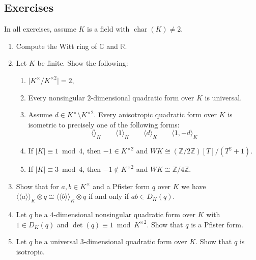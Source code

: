 \documentclass[12pt, leqno, british]{amsart}
\theoremstyle{definition}
\theoremstyle{plain}
\theoremstyle{remark}
\newcommand{\mbb}{\mathbb}
\newcommand{\cc}{\mathbb C}
\newcommand{\rr}{\mathbb R}
\newcommand{\zz}{\mbb Z}
\DeclareMathOperator{\charac}{char}
\newcommand{\llangle}{\langle\!\langle}
\newcommand{\rrangle}{\rangle\!\rangle}
\begin{document}
\subsection{Exercises}
In all exercises, assume $K$ is a field with $\charac(K) \neq 2$.
\begin{enumerate}
\item Compute the Witt ring of $\cc$ and $\rr$.
\item Let $K$ be finite.
Show the following:
\begin{enumerate}
\item $\lvert K^\times / K^{\times 2} \rvert = 2$,
\item Every nonsingular $2$-dimensional quadratic form over $K$ is universal.
\item Assume $d \in K^\times \setminus K^{\times 2}$.
Every anisotropic quadratic form over $K$ is isometric to precisely one of the following forms:
\begin{displaymath}
\langle \rangle_K \qquad \langle 1 \rangle_K \qquad \langle d \rangle_K \qquad \langle 1, -d \rangle_K
\end{displaymath}
\item If $\lvert K \rvert \equiv 1 \bmod 4$, then $-1 \in K^{\times 2}$ and $WK \cong (\zz/2\zz)[T]/(T^2 + 1)$.
\item If $\lvert K \rvert \equiv 3 \bmod 4$, then $-1 \not\in K^{\times 2}$ and $WK \cong \zz/4\zz$.
\end{enumerate}
\item
Show that for $a, b \in K^\times$ and a Pfister form $q$ over $K$ we have $\llangle a \rrangle_K \otimes q \cong \llangle b \rrangle_K \otimes q$ if and only if $ab \in D_K(q)$.
\item Let $q$ be a $4$-dimensional nonsingular quadratic form over $K$ with $1 \in D_K(q)$ and $\det(q) \equiv 1 \bmod K^{\times 2}$.
Show that $q$ is a Pfister form.
\item Let $q$ be a universal $3$-dimensional quadratic form over $K$.
Show that $q$ is isotropic.
\end{enumerate}

\printindex
\printbibliography
\end{document}
